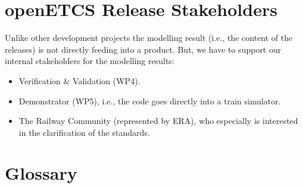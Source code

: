 \documentclass{template/openetcs_report}
\begin{document}
\section{openETCS Release Stakeholders}

Unlike other development projects the modelling result (i.e., the content of the releases) is not directly feeding into a product. But, we have to support our internal stakeholders for the modelling results:
\begin{itemize}
\item Verification \& Validation (WP4).
\item Demonstrator (WP5), i.e., the code goes directly into a train simulator.
\item The Railway Community (represented by ERA), who especially is interested in the clarification of the standards.

\end{itemize}


\section{Glossary}
\label{sec:glossary}
\end{document}
